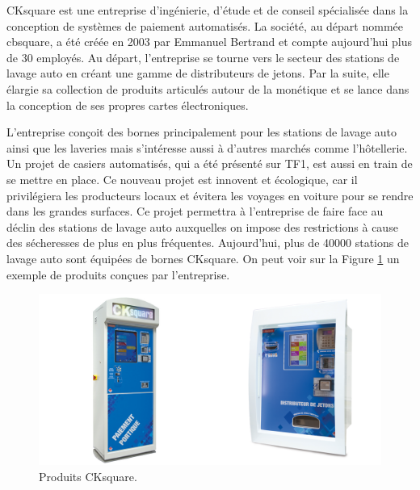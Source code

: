 \documentclass[a4paper]{article}
\begin{document}
CKsquare est une entreprise d'ingénierie, d'étude et de conseil spécialisée dans
la conception de systèmes de paiement automatisés. La société, au départ nommée
cbsquare, a été créée en 2003 par Emmanuel Bertrand et compte aujourd'hui plus
de 30 employés. Au départ, l'entreprise se tourne vers le secteur des stations
de lavage auto en créant une gamme de distributeurs de jetons. Par la suite,
elle élargie sa collection de produits articulés autour de la monétique et se
lance dans la conception de ses propres cartes électroniques.

L'entreprise conçoit des bornes principalement pour les stations de lavage auto
ainsi que les laveries mais s'intéresse aussi à d'autres marchés comme
l'hôtellerie. Un projet de casiers automatisés, qui a été présenté sur TF1, est
aussi en train de se mettre en place. Ce nouveau projet est innovent et
écologique, car il privilégiera les producteurs locaux et évitera les voyages en
voiture pour se rendre dans les grandes surfaces. Ce projet permettra à
l'entreprise de faire face au déclin des stations de lavage auto auxquelles on
impose des restrictions à cause des sécheresses de plus en plus fréquentes.
Aujourd'hui, plus de 40000 stations de lavage auto sont équipées de bornes
CKsquare. On peut voir sur la Figure \ref{bornes-intro} un exemple de produits
conçues par l'entreprise.

\begin{figure}[h!]
  \begin{center}
  \includegraphics[scale=0.2]{./img/bornes.png}
  \caption{Produits CKsquare.}
    \label{bornes-intro}
  \end{center}
\end{figure}
\end{document}
